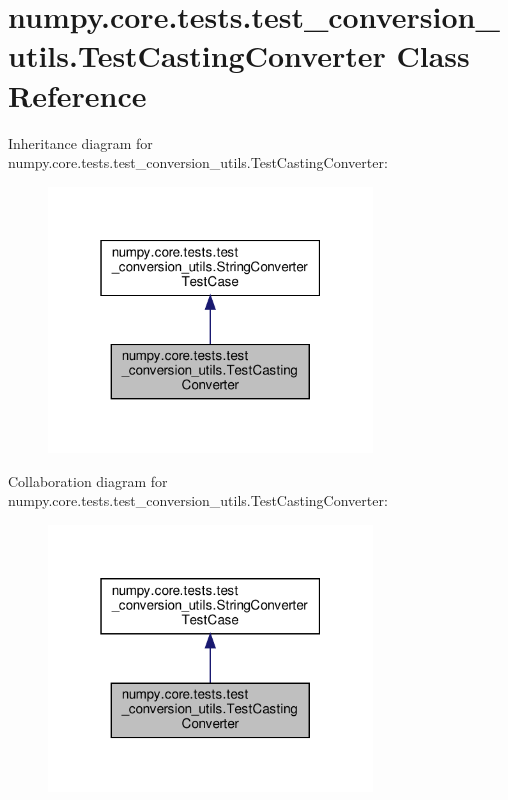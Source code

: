 \hypertarget{classnumpy_1_1core_1_1tests_1_1test__conversion__utils_1_1TestCastingConverter}{}\section{numpy.\+core.\+tests.\+test\+\_\+conversion\+\_\+utils.\+Test\+Casting\+Converter Class Reference}
\label{classnumpy_1_1core_1_1tests_1_1test__conversion__utils_1_1TestCastingConverter}


Inheritance diagram for numpy.\+core.\+tests.\+test\+\_\+conversion\+\_\+utils.\+Test\+Casting\+Converter\+:
\nopagebreak
\begin{figure}[H]
\begin{center}
\leavevmode
\includegraphics[width=244pt]{classnumpy_1_1core_1_1tests_1_1test__conversion__utils_1_1TestCastingConverter__inherit__graph}
\end{center}
\end{figure}


Collaboration diagram for numpy.\+core.\+tests.\+test\+\_\+conversion\+\_\+utils.\+Test\+Casting\+Converter\+:
\nopagebreak
\begin{figure}[H]
\begin{center}
\leavevmode
\includegraphics[width=244pt]{classnumpy_1_1core_1_1tests_1_1test__conversion__utils_1_1TestCastingConverter__coll__graph}
\end{center}
\end{figure}
